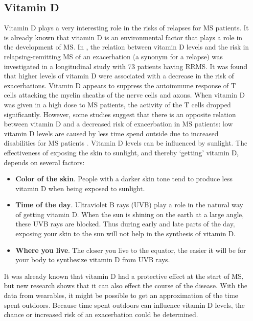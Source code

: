 \subsection{Vitamin D}
Vitamin D plays a very interesting role in the risks of relapses for MS patients. 
It is already known that vitamin D is an environmental factor that plays a role in the development of MS.
In \cite{runia2015multiple}, the relation between vitamin D levels and the risk in relapsing-remitting MS of an exacerbation (a synonym for a relapse) was investigated in a longitudinal study with 73 patients having RRMS. 
It was found that higher levels of vitamin D were associated with a decrease in the risk of exacerbations. 
Vitamin D appears to suppress the autoimmune response of T cells attacking the myelin sheaths of the nerve cells and axons.
When vitamin D was given in a high dose to MS patients, the activity of the T cells dropped significantly.
However, some studies suggest that there is an opposite relation between vitamin D and a decreased risk of exacerbation in MS patients: low vitamin D levels are caused by less time spend outside due to increased disabilities for MS patients \cite{van2007vitamin}.
Vitamin D levels can be influenced by sunlight.
The effectiveness of exposing the skin to sunlight, and thereby `getting' vitamin D, depends on several factors:
%
\begin{itemize}
	\item \textbf{Color of the skin}. People with a darker skin tone tend to produce less vitamin D when being exposed to sunlight.
	\item \textbf{Time of the day}. Ultraviolet B rays (UVB) play a role in the natural way of getting vitamin D. 
	When the sun is shining on the earth at a large angle, these UVB rays are blocked. 
	Thus during early and late parts of the day, exposing your skin to the sun will not help in the synthesis of vitamin D.
	\item \textbf{Where you live}. The closer you live to the equator, the easier it will be for your body to synthesize vitamin D from UVB rays. 
\end{itemize}
%
It was already known that vitamin D had a protective effect at the start of MS, but new research shows that it can also effect the course of the disease. 
With the data from wearables, it might be possible to get an approximation of the time spent outdoors.
Because time spent outdoors can influence vitamin D levels, the chance or increased risk of an exacerbation could be determined.

